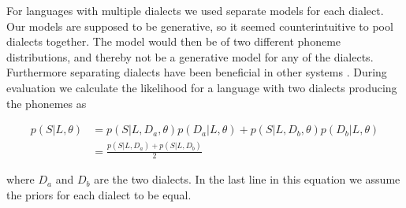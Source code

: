 For languages with multiple dialects we used separate models for each dialect. Our models are supposed to be generative, so it seemed counterintuitive to pool dialects together. The model would then be of two different phoneme distributions, and thereby not be a generative model for any of the dialects.  Furthermore separating dialects have been beneficial in other systems \cite[section 8.3.4]{matejka09}. During evaluation we calculate the likelihood for a language with two dialects producing the phonemes as

\begin{align}
p(S|L, \theta) &= p(S|L, D_a, \theta)p(D_a |L, \theta)+p(S|L, D_b, \theta)p(D_b|L, \theta) \nonumber \\
&= \frac{p(S|L, D_a)+p(S|L, D_b)}{2}
\end{align}

where $D_a$ and $D_b$ are the two dialects. In the last line in this equation we assume the priors for each dialect to be equal.